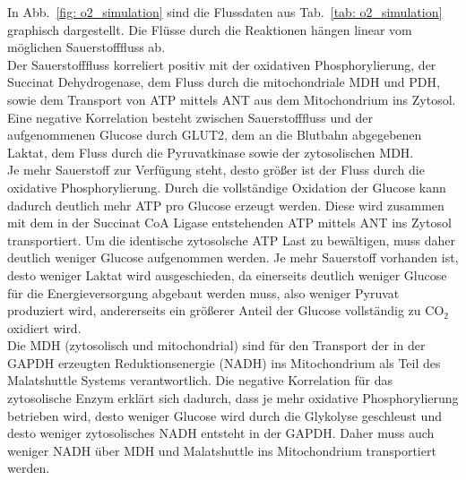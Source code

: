 In Abb.~\ref{fig: o2_simulation} sind die Flussdaten aus Tab.~\ref{tab: o2_simulation} graphisch dargestellt.
Die Flüsse durch die Reaktionen hängen linear vom möglichen Sauerstofffluss ab.\\
Der Sauerstofffluss korreliert positiv mit der oxidativen Phosphorylierung, der Succinat Dehydrogenase, dem Fluss durch die mitochondriale MDH und PDH, sowie dem Transport von ATP mittels ANT aus dem Mitochondrium ins Zytosol.\\
Eine negative Korrelation besteht zwischen Sauerstofffluss und der aufgenommenen Glucose durch GLUT2, dem an die Blutbahn abgegebenen Laktat, dem Fluss durch die Pyruvatkinase sowie der zytosolischen MDH.\\
Je mehr Sauerstoff zur Verfügung steht, desto größer ist der Fluss durch die oxidative Phosphorylierung. Durch die vollständige Oxidation der Glucose kann dadurch deutlich mehr ATP pro Glucose erzeugt werden. Diese wird zusammen mit dem in der Succinat CoA Ligase entstehenden ATP mittels ANT ins Zytosol transportiert. Um die identische  zytosolsche ATP Last zu bewältigen, muss daher deutlich weniger Glucose aufgenommen werden. Je mehr Sauerstoff vorhanden ist, desto weniger Laktat wird ausgeschieden, da einerseits deutlich weniger Glucose für die Energieversorgung abgebaut werden muss, also weniger Pyruvat produziert wird, andererseits ein größerer Anteil der Glucose vollständig zu $\text{CO}_2$ oxidiert wird.\\ 
Die MDH (zytosolisch und mitochondrial) sind für den Transport der in der GAPDH erzeugten Reduktionsenergie (NADH) ins Mitochondrium als Teil des Malatshuttle Systems verantwortlich. Die negative Korrelation für das zytosolische Enzym erklärt sich dadurch, dass je mehr oxidative Phosphorylierung betrieben wird, desto weniger Glucose wird durch die Glykolyse geschleust und desto weniger zytosolisches NADH entsteht in der GAPDH. Daher muss auch weniger NADH über MDH und Malatshuttle ins Mitochondrium transportiert werden.

